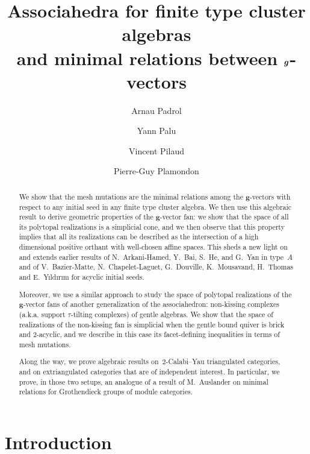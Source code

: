 \documentclass{amsart}
\title[Generalized associahedra and minimal relations between $\b{g}$-vectors]{Associahedra for finite type cluster algebras \\ and minimal relations between $\b{g}$-vectors}
\author{Arnau Padrol}
\author{Yann Palu}
\author{Vincent Pilaud}
\author{Pierre-Guy Plamondon}
\theoremstyle{definition}
\renewcommand{\b}[1]{{\boldsymbol{#1}}} %
\begin{document}
\begin{abstract}
We show that the mesh mutations are the minimal relations among the $\b{g}$-vectors with respect to any initial seed in any finite type cluster algebra.
We then use this algebraic result to derive geometric properties of the $\b{g}$-vector fan: we show that the space of all its polytopal realizations is a simplicial cone, and we then observe that this property implies that all its realizations can be described as the intersection of a high dimensional positive orthant with well-chosen affine spaces.
This sheds a new light on and extends earlier results of N.~Arkani-Hamed, Y.~Bai, S.~He, and G.~Yan in type~$A$ and of V.~Bazier-Matte, N.~Chapelet-Laguet, G.~Douville, K.~Mousavand, H.~Thomas and E.~Y\i ld\i r\i m for acyclic initial seeds.

Moreover, we use a similar approach to study the space of polytopal realizations of the \mbox{$\b{g}$-vector} fans of another generalization of the associahedron: non-kissing complexes (a.k.a. support $\tau$-tilting complexes) of gentle algebras. We show that the space of realizations of the non-kissing fan is simplicial when the gentle bound quiver is brick and $2$-acyclic, and we describe in this case its facet-defining inequalities in terms of mesh mutations.

Along the way, we prove algebraic results on~$2$-Calabi--Yau triangulated categories, and on extriangulated categories that are of independent interest.
In particular, we prove, in those two setups, an analogue of a result of M.~Auslander on minimal relations for Grothendieck groups of module categories.
\end{abstract}

\maketitle

%
\enlargethispage{.3cm}
\tableofcontents
\vspace{-.5cm}


\section*{Introduction}
\end{document}
